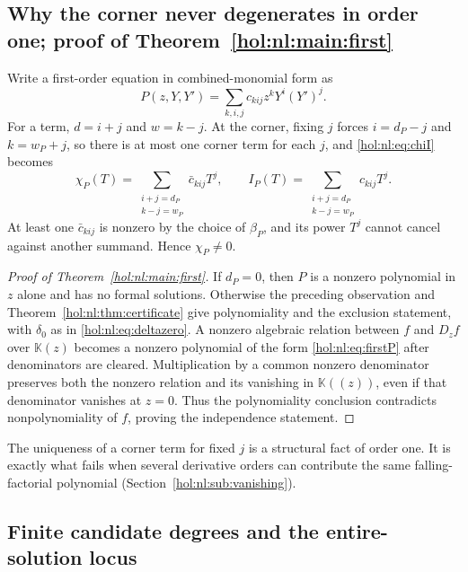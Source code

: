 \documentclass[11pt]{article}
\numberwithin{equation}{section}
\theoremstyle{definition}
\theoremstyle{remark}
\newcommand{\KK}{\mathbb K}
\begin{document}
\subsection{Why the corner never degenerates in order one; proof of
\texorpdfstring{Theorem~\ref{hol:nl:main:first}}{Theorem D}}
\label{hol:nl:sub:firstorder}

Write a first-order equation in combined-monomial form as
\begin{equation}\label{hol:nl:eq:firstP}
 P(z,Y,Y')=\sum_{k,i,j}c_{kij}z^kY^i(Y')^j.
\end{equation}
For a term, $d=i+j$ and $w=k-j$. At the corner, fixing $j$ forces
$i=d_P-j$ and $k=w_P+j$, so there is at most one corner term for each $j$, and
\eqref{hol:nl:eq:chiI} becomes
\begin{equation}\label{hol:nl:eq:firstchi}
 \chi_P(T)=\sum_{\substack{i+j=d_P\\ k-j=w_P}}\bar c_{kij}T^j,\qquad
 I_P(T)=\sum_{\substack{i+j=d_P\\ k-j=w_P}}c_{kij}T^j.
\end{equation}
At least one $\bar c_{kij}$ is nonzero by the choice of $\beta_P$, and its
power $T^j$ cannot cancel against another summand. Hence $\chi_P\ne0$.

\begin{proof}[Proof of Theorem~\ref{hol:nl:main:first}]
If $d_P=0$, then $P$ is a nonzero polynomial in $z$ alone and has no formal
solutions. Otherwise the preceding observation and
Theorem~\ref{hol:nl:thm:certificate} give polynomiality and the exclusion
statement, with $\delta_0$ as in \eqref{hol:nl:eq:deltazero}. A nonzero
algebraic relation between $f$ and $D_zf$ over $\KK(z)$ becomes a nonzero
polynomial of the form \eqref{hol:nl:eq:firstP} after denominators are
cleared. Multiplication by a common nonzero denominator preserves both the
nonzero relation and its vanishing in $\KK((z))$, even if that denominator
vanishes at $z=0$. Thus the polynomiality conclusion contradicts
nonpolynomiality of $f$, proving the independence statement.
\end{proof}

The uniqueness of a corner term for fixed $j$ is a structural fact of order
one. It is exactly what fails when several derivative orders can contribute
the same falling-factorial polynomial (Section~\ref{hol:nl:sub:vanishing}).

\subsection{Finite candidate degrees and the entire-solution locus}
\label{hol:nl:sub:degrees}
\end{document}
